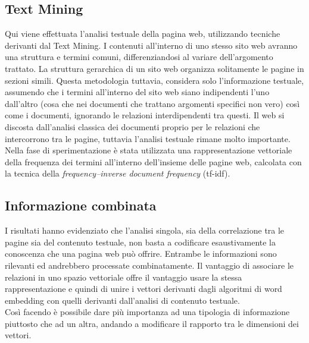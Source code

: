 \subsection{Text Mining}
Qui viene effettuata l'analisi testuale della pagina web, utilizzando tecniche derivanti dal Text Mining. I contenuti all'interno di uno stesso sito web avranno una struttura e termini comuni, differenziandosi al variare dell'argomento trattato. La struttura gerarchica di un sito web organizza solitamente le pagine in sezioni simili. Questa metodologia tuttavia, considera solo l'informazione testuale, assumendo che i termini all'interno del sito web siano indipendenti l'uno dall'altro (cosa che nei documenti che trattano argomenti specifici non  vero) così come i documenti, ignorando le relazioni interdipendenti tra questi. Il web si discosta dall'analisi classica dei documenti proprio per le relazioni che intercorrono tra le pagine, tuttavia l'analisi testuale rimane molto importante.
\\
Nella fase di sperimentazione è stata utilizzata una rappresentazione vettoriale della frequenza dei termini all'interno dell'insieme delle pagine web, calcolata con la tecnica della \textit{frequency–inverse document frequency} (tf-idf).

\subsection{Informazione combinata}
I risultati hanno evidenziato che l'analisi singola, sia della correlazione tra le pagine sia del contenuto testuale, non basta a codificare esaustivamente la conoscenza che una pagina web può offrire. Entrambe le informazioni sono rilevanti ed andrebbero processate combinatamente. Il vantaggio di associare le relazioni in uno spazio vettoriale offre il vantaggio usare la stessa rappresentazione e quindi di unire i vettori derivanti dagli algoritmi di word embedding con quelli derivanti dall'analisi di contenuto testuale. 
\\
Così facendo è possibile dare più importanza ad una tipologia di informazione piuttosto che ad un altra, andando a modificare il rapporto tra le dimensioni dei vettori.


